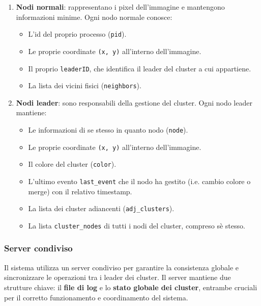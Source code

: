 \documentclass[12pt, a4paper]{report}
\begin{document}
\begin{enumerate}
    \item \textbf{Nodi normali}: rappresentano i pixel dell'immagine e mantengono informazioni minime. Ogni nodo normale conosce:
    \begin{itemize}
        \item L'id del proprio processo (\texttt{pid}).
        \item Le proprie coordinate \texttt{(x, y)} all'interno dell'immagine.
        \item Il proprio \texttt{leaderID}, che identifica il leader del cluster a cui appartiene.
        \item La lista dei vicini fisici (\texttt{neighbors}).
    \end{itemize}

    \item \textbf{Nodi leader}: sono responsabili della gestione del cluster. Ogni nodo leader mantiene:
    \begin{itemize}
        \item Le informazioni di se stesso in quanto nodo (\texttt{node}).
        \item Le proprie coordinate \texttt{(x, y)} all'interno dell'immagine.
        \item Il colore del cluster (\texttt{color}).
        \item L'ultimo evento \texttt{last\_event} che il nodo ha gestito (i.e. cambio colore o merge) con il relativo timestamp.
        \item La lista dei cluster adiancenti (\texttt{adj\_clusters}).
        \item La lista \texttt{cluster\_nodes} di tutti i nodi del cluster, compreso s\`e stesso.
    \end{itemize}
\end{enumerate}

\subsubsection{Server condiviso} 
Il sistema utilizza un server condiviso per garantire la consistenza globale e sincronizzare le operazioni tra i leader dei cluster. Il server mantiene due strutture chiave: il \textbf{file di log} e lo \textbf{stato globale dei cluster}, entrambe cruciali per il corretto funzionamento e coordinamento del sistema.
\end{document}
